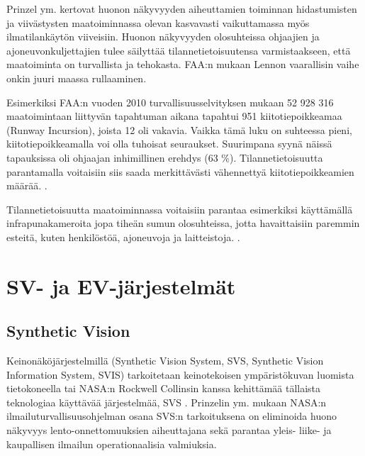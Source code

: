 \documentclass[utf8,bachelor,manualbib]{gradu3}
\begin{document}
Prinzel ym. \citeyearpar{prinzel2013} kertovat huonon näkyvyyden aiheuttamien toiminnan hidastumisten ja viivästysten maatoiminnassa olevan kasvavasti vaikuttamassa myös ilmatilankäytön viiveisiin. Huonon näkyvyyden olosuhteissa ohjaajien ja ajoneuvonkuljettajien tulee säilyttää tilannetietoisuutensa varmistaakseen, että maatoiminta on turvallista ja tehokasta. FAA:n mukaan \citeyearpar{gerold2001} Lennon vaarallisin vaihe onkin juuri maassa rullaaminen.

Esimerkiksi FAA:n vuoden 2010 turvallisuusselvityksen mukaan 52 928 316 maatoimintaan liittyvän tapahtuman aikana tapahtui 951 kiitotiepoikkeamaa (Runway Incursion), joista 12 oli vakavia. Vaikka tämä luku on suhteessa pieni, kiitotiepoikkeamalla voi olla tuhoisat seuraukset. Suurimpana syynä näissä tapauksissa oli ohjaajan inhimillinen erehdys (63 \%). Tilannetietoisuutta parantamalla voitaisiin siis saada merkittävästi vähennettyä kiitotiepoikkeamien määrää. \citep{prinzel2013}.

Tilannetietoisuutta maatoiminnassa voitaisiin parantaa esimerkiksi käyttämällä infrapunakameroita jopa tiheän sumun olosuhteissa, jotta havaittaisiin paremmin esteitä, kuten henkilöstöä, ajoneuvoja ja laitteistoja. \citep{beiergemperlein2004}.













\chapter{SV- ja EV-järjestelmät}

\section{Synthetic Vision}

Keinonäköjärjestelmillä (Synthetic Vision System, SVS, Synthetic Vision Information System, SVIS) tarkoitetaan keinotekoisen ympäristökuvan luomista  tietokoneella \citep{baileyym2007} tai NASA:n Rockwell Collinsin kanssa kehittämää tällaista teknologiaa käyttävää järjestelmää, SVS \citep{crawfordneal2006}. Prinzelin ym. \citeyearpar{prinzel2004} mukaan NASA:n ilmailuturvallisuusohjelman osana SVS:n tarkoituksena on eliminoida huono näkyvyys lento-onnettomuuksien aiheuttajana sekä parantaa yleis- liike- ja kaupallisen ilmailun operationaalisia valmiuksia.
\end{document}
